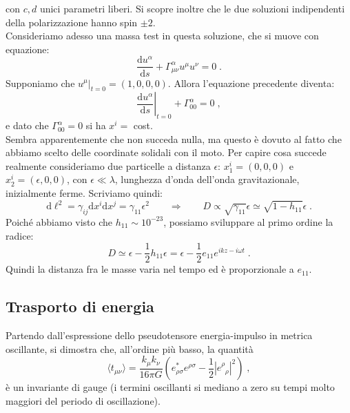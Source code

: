 \documentclass[12pt,a4paper]{report}
\theoremstyle{definition}
\newcommand{\diff}[1][]{\mathrm{d}#1}
\newcommand{\bra}{\langle}
\newcommand{\ket}{\rangle}
\newcommand{\conn}[3]{\Gamma^{#1}_{#2 #3}}
\begin{document}
con $c,d$ unici parametri liberi. Si scopre inoltre che le due soluzioni indipendenti della polarizzazione hanno spin $\pm 2$. \\
Consideriamo adesso una massa test in questa soluzione, che si muove con equazione:
\begin{equation}
\frac{\diff{u}^{\alpha}}{\diff{s}}+\conn{\alpha}{\mu}{\nu}u^{\mu}u^{\nu}=0\;.
\end{equation}
Supponiamo che $u^{\mu}|_{t=0}=(1,0,0,0)$. Allora l'equazione precedente diventa:
$$
\left.\frac{\diff{u}^{\alpha}}{\diff{s}}\right|_{t=0}+\conn{\alpha}{0}{0}=0\;,
$$
e dato che $\conn{\alpha}{0}{0}=0$ si ha $x^i=$ cost. \\
Sembra apparentemente che non succeda nulla, ma questo è dovuto al fatto che abbiamo scelto delle coordinate solidali con il moto. Per capire cosa succede realmente consideriamo due particelle a distanza $\epsilon$: $x_1^i=(0,0,0)$ e $x_2^i=(\epsilon,0,0)$, con $\epsilon\ll \lambda$, lunghezza d'onda dell'onda gravitazionale, inizialmente ferme. Scriviamo quindi:
\begin{equation}
\diff{\ell^2}=\gamma_{ij}\diff{x^i}\diff{x^j}=\gamma_{11}\epsilon^2\qquad \Longrightarrow\qquad D\propto \sqrt{\gamma_{11}}\epsilon\simeq \sqrt{1-h_{11}}\epsilon\;.
\end{equation}
Poiché abbiamo visto che $h_{11}\sim 10^{-23}$, possiamo sviluppare al primo ordine la radice:
\begin{equation}
D\simeq \epsilon-\frac{1}{2}h_{11}\epsilon=\epsilon-\frac{1}{2}e_{11}e^{ikz-i\omega t}\;.
\end{equation}
Quindi la distanza fra le masse varia nel tempo ed è proporzionale a $e_{11}$.
\subsection*{Trasporto di energia}
Partendo dall'espressione dello pseudotensore energia-impulso in metrica oscillante, si dimostra che, all'ordine più basso, la quantità
\begin{equation}
\bra t_{\mu\nu}\ket =\frac{k_{\mu}k_{\nu}}{16\pi G}\left(e_{\rho\sigma}^*e^{\rho\sigma}-\frac{1}{2}|e^{\rho}_{\;\;\rho}|^2\right)\;,
\end{equation}
è un invariante di gauge (i termini oscillanti si mediano a zero su tempi molto maggiori del periodo di oscillazione).
\end{document}
